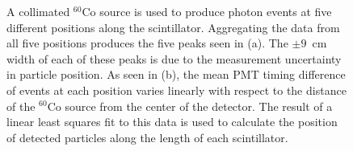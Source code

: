 \begin{figure}[]
    \centering

    \caption{
    A collimated $^{60}$Co source is used to produce photon events at five different positions along the scintillator.
    Aggregating the data from all five positions produces the five peaks seen in (a).
    The $\pm9$~cm width of each of these peaks is due to the measurement uncertainty in particle position.
    As seen in (b), the mean PMT timing difference of events at each position varies linearly with respect to the distance of the $^{60}$Co source from the center of the detector. 
    The result of a linear least squares fit to this data is used to calculate the position of detected particles along the length of each scintillator.
    }
    \label{fig:PMTDifference}
\end{figure}


